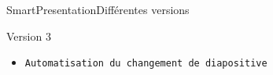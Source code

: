\documentclass[10pt]{beamer}
\begin{document}
\begin{frame}{SmartPresentation}{Différentes versions}
	\begin{block}{Version 3}
	  	\begin{itemize}
    			\item {\tt Automatisation du changement de diapositive}
		\end{itemize}
	\end{block}
\end{frame}


\end{document}
